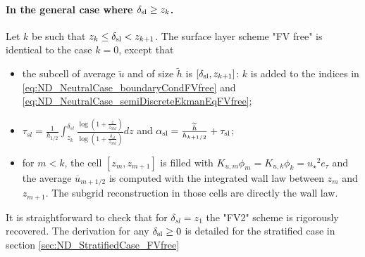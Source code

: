 \paragraph{In the general case where $\delta_{\rm sl} \geq z_k$.}
Let $k$ be such that $z_k \leq \delta_{\rm sl} < z_{k+1}$.
The surface layer scheme "FV free" is identical to the case $k=0$, except that
\begin{itemize}
	\item the subcell of average $\widetilde{u}$ and of size
		$\widetilde{h}$ is $[\delta_{\rm sl}, z_{k+1}]$:
		$k$ is added to the indices in 
		\eqref{eq:ND_NeutralCase_boundaryCondFVfree} and
		\eqref{eq:ND_NeutralCase_semiDiscreteEkmanEqFVfree};
	\item $\tau_{sl} = \frac{1}{{h_{1/2}}}\int_{z_k}^{\delta_{sl}} \frac{\log(1+\frac{z}{z_{0M}})}{\log(1+\frac{\delta_{sl}}{z_{0M}})} dz$ and $\alpha_{\rm sl} = \frac{\widetilde{h}}{h_{k+1/2}} + \tau_{\rm sl}$;
	\item for $m < k$, the cell $[z_m, z_{m+1}]$ is filled with
		$K_{u,m} \phi_m = K_{u,k}\phi_k =
	{u_\star}^2e_\tau$
		and the average $\overline{u}_{m+1/2}$
		is computed with the integrated wall law
		between $z_m$ and $z_{m+1}$.
		The subgrid reconstruction in those cells are directly
		the wall law.
\end{itemize}
It is straightforward to check that for $\delta_{sl} = z_1$
the "FV2" scheme is rigorously recovered.
The derivation for any $\delta_{\rm sl} \geq 0$ is detailed for
the stratified case in section \ref{sec:ND_StratifiedCase_FVfree}
